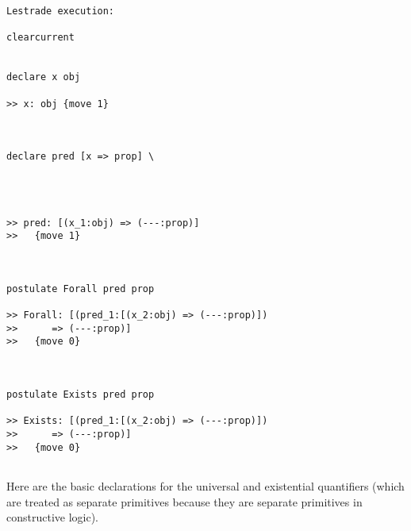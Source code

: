 \documentclass[12pt]{article}
\begin{document}
\begin{verbatim}Lestrade execution:

clearcurrent


declare x obj

>> x: obj {move 1}



declare pred [x => prop] \
   



>> pred: [(x_1:obj) => (---:prop)]
>>   {move 1}



postulate Forall pred prop

>> Forall: [(pred_1:[(x_2:obj) => (---:prop)])
>>      => (---:prop)]
>>   {move 0}



postulate Exists pred prop

>> Exists: [(pred_1:[(x_2:obj) => (---:prop)])
>>      => (---:prop)]
>>   {move 0}


\end{verbatim}

Here are the basic declarations for the universal and existential quantifiers (which are treated as separate primitives because they are separate
primitives in constructive logic).  
\end{document}
